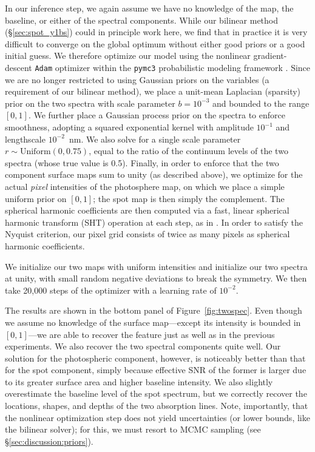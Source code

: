 \documentclass[modern]{aastex631}
\begin{document}
In our inference step, we again assume we have no knowledge of the map, the baseline, or either of the spectral components.
While our bilinear method (\S\ref{sec:spot_y1bs}) could in principle work here, we find that in practice it is very difficult to converge on the global optimum without either good priors or a good initial guess.
We therefore optimize our model using the nonlinear gradient-descent \texttt{Adam} optimizer \citep{Adam} within the \texttt{pymc3} probabilistic modeling framework \citep{Salvatier2016}.
Since we are no longer restricted to using Gaussian priors on the variables (a requirement of our bilinear method), we place a unit-mean Laplacian (sparsity) prior on the two spectra with scale parameter $b = 10^{-3}$ and bounded to the range $[0, 1]$.
%
We further place a Gaussian process prior on the spectra to enforce smoothness, adopting a squared exponential kernel with amplitude $10^{-1}$ and lengthscale $10^{-2}$~nm.
%
We also solve for a single scale parameter $r \sim \mathrm{Uniform}(0, 0.75)$, equal to the ratio of the continuum levels of the two spectra (whose true value is 0.5).
Finally, in order to enforce that the two component surface maps sum to unity (as described above), we optimize for the actual \emph{pixel} intensities of the photosphere map, on which we place a simple uniform prior on $[0, 1]$; the spot map is then simply the complement.
The spherical harmonic coefficients are then computed via a fast, linear spherical harmonic transform (SHT) operation at each step, as in \citep{Bartolic2021}.
In order to satisfy the Nyquist criterion, our pixel grid consists of twice as many pixels as spherical harmonic coefficients.

We initialize our two maps with uniform intensities and initialize our two spectra at unity, with small random negative deviations to break the symmetry.
We then take 20,000 steps of the optimizer with a learning rate of $10^{-2}$.

The results are shown in the bottom panel of Figure~\ref{fig:twospec}.
Even though we assume no knowledge of the surface map---except its intensity is bounded in $[0, 1]$---we are able to recover the \spot feature just as well as in the previous experiments.
We also recover the two spectral components quite well.
Our solution for the photospheric component, however, is noticeably better than that for the spot component, simply because effective SNR of the former is larger due to its greater surface area and higher baseline intensity.
We also slightly overestimate the baseline level of the spot spectrum, but we correctly recover the locations, shapes, and depths of the two absorption lines.
Note, importantly, that the nonlinear optimization step does not yield uncertainties (or lower bounds, like the bilinear solver); for this, we must resort to MCMC sampling (see \S\ref{sec:discussion:priors}).
\end{document}
